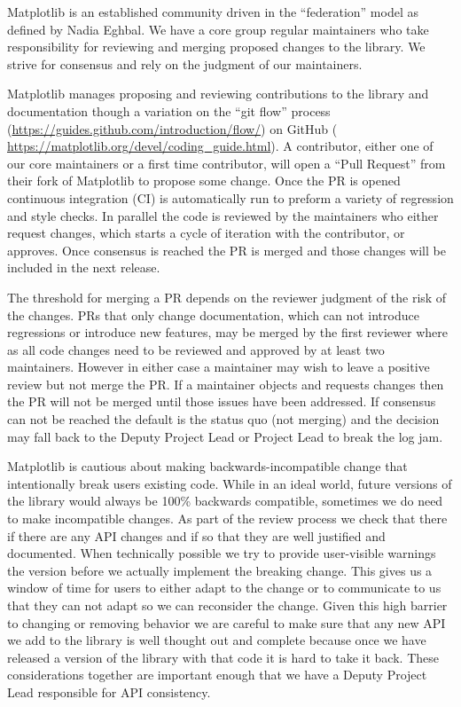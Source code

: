 \documentclass[12pt]{article}
\numberwithin{page}{section}
\begin{document}
Matplotlib is an established community driven in the ``federation''
model as defined by Nadia Eghbal\cite{eghbal_2020}.  We have a core
group regular maintainers who take responsibility for reviewing and
merging proposed changes to the library.  We strive for consensus and
rely on the judgment of our maintainers.

Matplotlib manages proposing and reviewing contributions to the
library and documentation though a variation on the ``git flow''
process (\url{https://guides.github.com/introduction/flow/})
on GitHub (
\url{https://matplotlib.org/devel/coding_guide.html}).  A contributor,
either one of our core maintainers or a first time contributor, will
open a ``Pull Request'' from their fork of Matplotlib to propose some
change.  Once the PR is opened continuous integration (CI) is
automatically run to preform a variety of regression and style checks.
In parallel the code is reviewed by the maintainers who either request
changes, which starts a cycle of iteration with the contributor, or
approves.  Once consensus is reached the PR is merged and those
changes will be included in the next release.

The threshold for merging a PR depends on the reviewer judgment of the
risk of the changes.  PRs that only change documentation, which can
not introduce regressions or introduce new features, may be merged by
the first reviewer where as all code changes need to be reviewed and
approved by at least two maintainers.  However in either case a
maintainer may wish to leave a positive review but not merge the PR.
If a maintainer objects and requests changes then the PR will not be
merged until those issues have been addressed.  If consensus can not
be reached the default is the status quo (not merging) and the
decision may fall back to the Deputy Project Lead or Project Lead to
break the log jam.

Matplotlib is cautious about making backwards-incompatible change that
intentionally break users existing code.  While in an ideal world,
future versions of the library would always be 100\% backwards
compatible, sometimes we do need to make incompatible changes.  As
part of the review process we check that there if there are any API
changes and if so that they are well justified and documented.  When
technically possible we try to provide user-visible warnings the
version before we actually implement the breaking change.  This gives
us a window of time for users to either adapt to the change or to
communicate to us that they can not adapt so we can reconsider the
change.  Given this high barrier to changing or removing behavior we
are careful to make sure that any new API we add to the library is
well thought out and complete because once we have released a version
of the library with that code it is hard to take it back.  These
considerations together are important enough that we have a Deputy
Project Lead responsible for API consistency.
\end{document}
